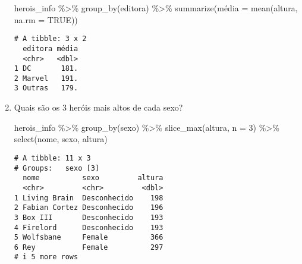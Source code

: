 \documentclass[
  letterpaper,
  DIV=11,
  numbers=noendperiod]{scrreprt}
\newenvironment{Shaded}{\begin{snugshade}}{\end{snugshade}}
\newcommand{\AttributeTok}[1]{\textcolor[rgb]{0.40,0.45,0.13}{#1}}
\newcommand{\ConstantTok}[1]{\textcolor[rgb]{0.56,0.35,0.01}{#1}}
\newcommand{\DecValTok}[1]{\textcolor[rgb]{0.68,0.00,0.00}{#1}}
\newcommand{\FunctionTok}[1]{\textcolor[rgb]{0.28,0.35,0.67}{#1}}
\newcommand{\NormalTok}[1]{\textcolor[rgb]{0.00,0.23,0.31}{#1}}
\newcommand{\OtherTok}[1]{\textcolor[rgb]{0.00,0.23,0.31}{#1}}
\newcommand{\SpecialCharTok}[1]{\textcolor[rgb]{0.37,0.37,0.37}{#1}}
\begin{document}
\begin{enumerate}
\begin{tcolorbox}
\begin{Shaded}
\begin{Highlighting}[]
\NormalTok{herois\_info }\SpecialCharTok{\%\textgreater{}\%} 
  \FunctionTok{group\_by}\NormalTok{(editora) }\SpecialCharTok{\%\textgreater{}\%} 
  \FunctionTok{summarize}\NormalTok{(média }\OtherTok{=} \FunctionTok{mean}\NormalTok{(altura, }\AttributeTok{na.rm =} \ConstantTok{TRUE}\NormalTok{))}
\end{Highlighting}
\end{Shaded}

\begin{verbatim}
# A tibble: 3 x 2
  editora média
  <chr>   <dbl>
1 DC       181.
2 Marvel   191.
3 Outras   179.
\end{verbatim}

  \end{tcolorbox}
\item
  Quais são os $3$ heróis mais altos de cada sexo?

  \begin{tcolorbox}[enhanced jigsaw, coltitle=black, colbacktitle=quarto-callout-tip-color!10!white, title=\textcolor{quarto-callout-tip-color}{\faLightbulb}\hspace{0.5em}{Resposta}, toprule=.15mm, leftrule=.75mm, opacityback=0, colback=white, arc=.35mm, breakable, bottomtitle=1mm, left=2mm, toptitle=1mm, titlerule=0mm, rightrule=.15mm, bottomrule=.15mm, opacitybacktitle=0.6, colframe=quarto-callout-tip-color-frame]

\begin{Shaded}
\begin{Highlighting}[]
\NormalTok{herois\_info }\SpecialCharTok{\%\textgreater{}\%} 
  \FunctionTok{group\_by}\NormalTok{(sexo) }\SpecialCharTok{\%\textgreater{}\%} 
  \FunctionTok{slice\_max}\NormalTok{(altura, }\AttributeTok{n =} \DecValTok{3}\NormalTok{) }\SpecialCharTok{\%\textgreater{}\%} 
  \FunctionTok{select}\NormalTok{(nome, sexo, altura)}
\end{Highlighting}
\end{Shaded}

\begin{verbatim}
# A tibble: 11 x 3
# Groups:   sexo [3]
  nome          sexo         altura
  <chr>         <chr>         <dbl>
1 Living Brain  Desconhecido    198
2 Fabian Cortez Desconhecido    196
3 Box III       Desconhecido    193
4 Firelord      Desconhecido    193
5 Wolfsbane     Female          366
6 Rey           Female          297
# i 5 more rows
\end{verbatim}


\end{tcolorbox}
\end{enumerate}
\end{document}
